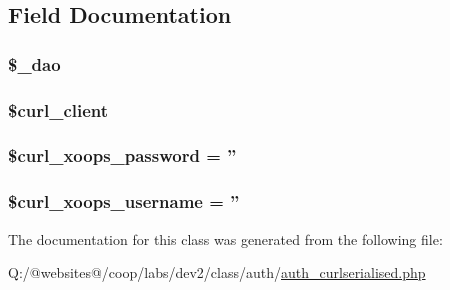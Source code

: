 \subsection{Field Documentation}
\hypertarget{class_xortify_auth_curlserialised_a12a029c610f699b4b25e79a1f64a3485}{
\subsubsection[{\$\-\_\-dao}]{\setlength{\rightskip}{0pt plus 5cm}\$\-\_\-dao}}\label{class_xortify_auth_curlserialised_a12a029c610f699b4b25e79a1f64a3485}
\hypertarget{class_xortify_auth_curlserialised_a402f2112991f3227835af80e9df33e38}{
\subsubsection[{\$curl\-\_\-client}]{\setlength{\rightskip}{0pt plus 5cm}\$curl\-\_\-client}}\label{class_xortify_auth_curlserialised_a402f2112991f3227835af80e9df33e38}
\hypertarget{class_xortify_auth_curlserialised_a6c9851541ed3826c67cfe7224c38f0b8}{
\subsubsection[{\$curl\-\_\-xoops\-\_\-password}]{\setlength{\rightskip}{0pt plus 5cm}\$curl\-\_\-xoops\-\_\-password = ''}}\label{class_xortify_auth_curlserialised_a6c9851541ed3826c67cfe7224c38f0b8}
\hypertarget{class_xortify_auth_curlserialised_aab7480ba9f878a02b2c9fd43922fa070}{
\subsubsection[{\$curl\-\_\-xoops\-\_\-username}]{\setlength{\rightskip}{0pt plus 5cm}\$curl\-\_\-xoops\-\_\-username = ''}}\label{class_xortify_auth_curlserialised_aab7480ba9f878a02b2c9fd43922fa070}


The documentation for this class was generated from the following file\-:\begin{DoxyCompactItemize}
\item 
Q\-:/@websites@/coop/labs/dev2/class/auth/\hyperlink{auth__curlserialised_8php}{auth\-\_\-curlserialised.\-php}\end{DoxyCompactItemize}
